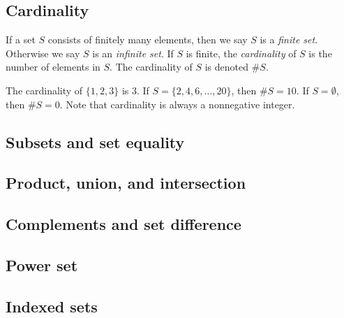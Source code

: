 \documentclass{tufte-book}
\begin{document}
\subsection{Cardinality}
\label{sec:cardinality}

\begin{definition}
  If a set $S$ consists of finitely many elements, then we say $S$ is a \emph{finite set}. Otherwise we say $S$ is an \emph{infinite set}. If $S$ is finite, the \emph{cardinality} of $S$ is the number of elements in $S$. The cardinality of $S$ is denoted $\# S$.
\end{definition}

The cardinality of $\{1, 2, 3\}$ is 3. If $S = \{2, 4, 6, \dots, 20\}$, then $\# S = 10$. If $S = \emptyset$, then $\# S = 0$. Note that cardinality is always a nonnegative integer. 

\subsection{Subsets and set equality}
\label{sec:subsets}


\subsection{Product, union, and intersection}
\label{sec:prod-union-inters}



\subsection{Complements and set difference}
\label{sec:compl-set-diff}



\subsection{Power set}
\label{sec:power-set}



\subsection{Indexed sets}
\label{sec:indexed-sets}






\end{document}
